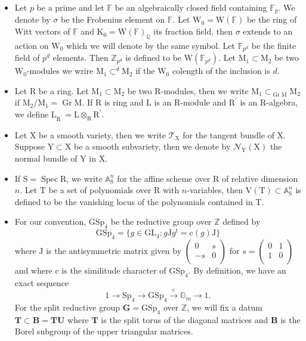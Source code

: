 \documentclass[10pt]{amsart}
\numberwithin{equation}{section}
\theoremstyle{definition}
\def\GL{\mathrm{GL}}
\def\GSp{\mathrm{GSp}}
\def\Sp{\mathrm{Sp}}
\DeclareMathOperator{\Gr}{Gr}
\DeclareMathOperator{\Spec}{Spec}
\def\calN{\mathcal{N}}
\def\calT{\mathcal{T}}
\def\bfB{\mathbf{B}}
\def\FF{\mathbb{F}}
\def\GG{\mathbb{G}}
\def\bfG{\mathbf{G}}
\def\QQ{\mathbb{Q}}
\def\bfT{\mathbf{T}}
\def\ZZ{\mathbb{Z}}
\def\bfU{\mathbf{U}}
\def\rmc{\mathrm{c}}
\def\rmD{\mathrm{D}}
\def\rmJ{\mathrm{J}}
\def\rmK{\mathrm{K}}
\def\rmL{\mathrm{L}}
\def\rmM{\mathrm{M}}
\def\rmV{\mathrm{V}}
\def\rmW{\mathrm{W}}
\def\rmR{\mathrm{R}}
\def\rmS{\mathrm{S}}
\def\rmX{\mathrm{X}}
\def\rmY{\mathrm{Y}}
\def\rmT{\mathrm{T}}
\begin{document}
\begin{itemize}
\item Let $p$ be a prime and let $\FF$ be an algebraically closed field containing $\FF_{p}$. We denote by $\sigma$ be the Frobenius element on $\FF$. Let $\rmW_{0}=\rmW(\FF)$ be the ring of Witt vectors of $\FF$ and $\rmK_{0}=\rmW(\FF)_{\QQ}$ its fraction field, then $\sigma$ extends to an action on $\rmW_{0}$ which we will denote by the same symbol. Let $\FF_{p^{d}}$ be the finite field of $p^{d}$ elements. Then $\ZZ_{p^{d}}$ is defined to be $\rmW(\FF_{p^{d}})$. Let $\rmM_{1}\subset \rmM_{2}$ be two $\rmW_{0}$-modules we wrire $\rmM_{1}\subset^{d} \rmM_{2}$ if the $\rmW_{0}$ colength of the inclusion is $d$. 
\item Let $\rmR$ be a ring. Let $\rmM_{1}\subset \rmM_{2}$ be two $\rmR$-modules, then we write $\rmM_{1}\subset_{\Gr\rmM}\rmM_{2}$ if $\rmM_{2}/\rmM_{1}=\Gr\rmM$. If $\rmR$ is ring and $\rmL$ is an $\rmR$-module and $\rmR^{\prime}$ is an $\rmR$-algebra, we define $\rmL_{\rmR^{\prime}}=\rmL\otimes_{\rmR} \rmR^{\prime}$.

\item Let $\rmX$ be a smooth variety, then we write $\calT_{\rmX}$ for the tangent bundle of $\rmX$. Suppose $\rmY\subset \rmX$ be a smooth  subvariety, then we denote by $\calN_{\rmY}(\rmX)$ the normal bundle of $\rmY$ in $\rmX$. 
\item If $\rmS=\Spec\rmR$, we write $\mathbb{A}^{n}_{\rmS}$ for the affine scheme over $\rmR$ of relative dimension $n$. Let $\rmT$ be a set of polynomials over $\rmR$ with $n$-variables, then $\rmV(\rmT)\subset \mathbb{A}^{n}_{\rmS}$ is defined to be the vanishing locus of the polynomials contained in $\rmT$. 


\item For our convention, $\GSp_{4}$ be the reductive group over $\ZZ$ defined by 
\begin{equation*}
\GSp_{4}=\{g\in\GL_{4}: g\rmJ g^{t}=\rmc(g)\rmJ\}
\end{equation*}
where $\rmJ$ is the antisymmetric matrix given by $\begin{pmatrix}0&s\\-s&0\\ \end{pmatrix}$
for $s=\begin{pmatrix}0&1\\ 1&0 \\ \end{pmatrix}$ and where $\rmc$ is the similitude character of $\GSp_{4}$. By definition, we have an exact sequence 
\begin{equation*}
1\rightarrow \Sp_{4}\rightarrow \GSp_{4}\xrightarrow{\rmc}\GG_{m}\rightarrow 1.
\end{equation*}
For the split reductive group $\bfG=\GSp_{4}$ over $\ZZ$, we will fix a datum $\bfT\subset \bfB =\bfT\bfU$ where $\bfT$ is the split torus of the diagonal matrices and $\bfB$ is the Borel subgroup of the upper triangular matrices. 


\end{itemize}
\end{document}

